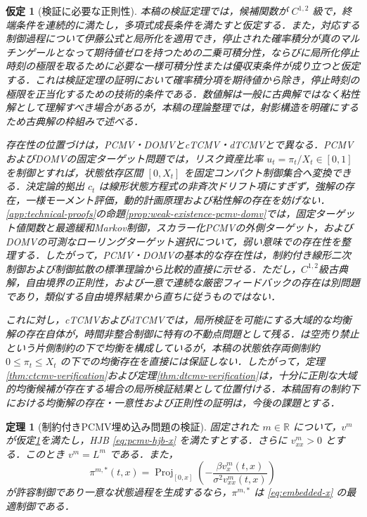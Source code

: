 \documentclass[10pt,a4paper]{article}
\theoremstyle{plain}
\newtheorem{theorem}{定理}
\newtheorem{assumption}{仮定}
\theoremstyle{definition}
\DeclareMathOperator{\Proj}{Proj}
\newcommand{\R}{\mathbb{R}}
\begin{document}
\begin{assumption}[検証に必要な正則性]
\label{ass:verification}
本稿の検証定理では，候補関数が $C^{1,2}$ 級で，終端条件を連続的に満たし，多項式成長条件を満たすと仮定する．また，対応する制御過程について伊藤公式と局所化を適用でき，停止された確率積分が真のマルチンゲールとなって期待値ゼロを持つための二乗可積分性，ならびに局所化停止時刻の極限を取るために必要な一様可積分性または優収束条件が成り立つと仮定する．これは検証定理の証明において確率積分項を期待値から除き，停止時刻の極限を正当化するための技術的条件である．数値解は一般に古典解ではなく粘性解として理解すべき場合があるが，本稿の理論整理では，射影構造を明確にするため古典解の枠組みで述べる．

存在性の位置づけは，PCMV・DOMVとcTCMV・dTCMVとで異なる．PCMVおよびDOMVの固定ターゲット問題では，リスク資産比率 $u_t=\pi_t/X_t\in[0,1]$ を制御とすれば，状態依存区間 $[0,X_t]$ を固定コンパクト制御集合へ変換できる．決定論的拠出 $c_t$ は線形状態方程式の非斉次ドリフト項にすぎず，強解の存在，一様モーメント評価，動的計画原理および粘性解の存在を妨げない．\ref{app:technical-proofs}の命題\ref{prop:weak-existence-pcmv-domv}では，固定ターゲット値関数と最適緩和Markov制御，スカラー化PCMVの外側ターゲット，およびDOMVの可測なローリングターゲット選択について，弱い意味での存在性を整理する．したがって，PCMV・DOMVの基本的な存在性は，制約付き線形二次制御および制御拡散の標準理論から比較的直接に示せる\citep{LiZhouLim2002,LiXu2015,FlemingSoner2006}．ただし，$C^{1,2}$級古典解，自由境界の正則性，および一意で連続な厳密フィードバックの存在は別問題であり，類似する自由境界結果\citep{GuanLiZhouZhou2022}から直ちに従うものではない．

これに対し，cTCMVおよびdTCMVでは，局所検証を可能にする大域的な均衡解の存在自体が，時間非整合制御に特有の不動点問題として残る．\citet{BensoussanWongYamYung2014}は空売り禁止という片側制約の下で均衡を構成しているが，本稿の状態依存両側制約 $0\leq\pi_t\leq X_t$ の下での均衡存在を直接には保証しない．したがって，定理\ref{thm:ctcmv-verification}および定理\ref{thm:dtcmv-verification}は，十分に正則な大域的均衡候補が存在する場合の局所検証結果として位置付ける．本稿固有の制約下における均衡解の存在・一意性および正則性の証明は，今後の課題とする．
\end{assumption}

\begin{theorem}[制約付きPCMV埋め込み問題の検証]
\label{thm:embedded-pcmv}
固定された $m\in\R$ について，$v^m$ が仮定\ref{ass:verification}を満たし，HJB \eqref{eq:pcmv-hjb-x} を満たすとする．さらに $v_{xx}^m>0$ とする．このとき $v^m=L^m$ である．また，
\begin{equation}
  \pi^{m,*}(t,x)
  =
  \Proj_{[0,x]}
  \left(
  -\frac{\beta v_x^m(t,x)}{\sigma^2v_{xx}^m(t,x)}
  \right)
  \label{eq:pcmv-projection-x}
\end{equation}
が許容制御であり一意な状態過程を生成するなら，$\pi^{m,*}$ は \eqref{eq:embedded-x} の最適制御である．
\end{theorem}
\end{document}

